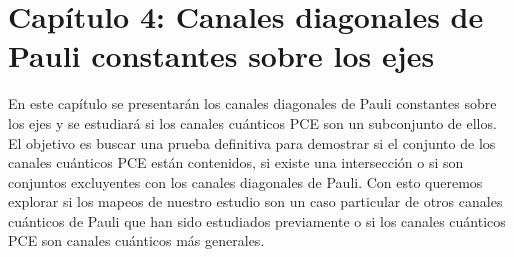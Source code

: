 \section*{Capítulo 4: Canales diagonales de Pauli constantes 
sobre los ejes}
En este capítulo se presentarán los canales diagonales de Pauli constantes 
sobre los ejes \cite{nathanson2007pauli} y se estudiará si los canales
cuánticos PCE son un subconjunto de ellos. El objetivo es buscar una 
prueba definitiva para demostrar si el conjunto de los canales 
cuánticos PCE están contenidos, si existe una intersección o 
si son conjuntos excluyentes con los canales diagonales de Pauli.
Con esto queremos explorar si los mapeos de nuestro estudio 
son un caso particular de otros canales cuánticos de Pauli que 
han sido estudiados previamente o si los canales cuánticos PCE 
son canales cuánticos más generales.
